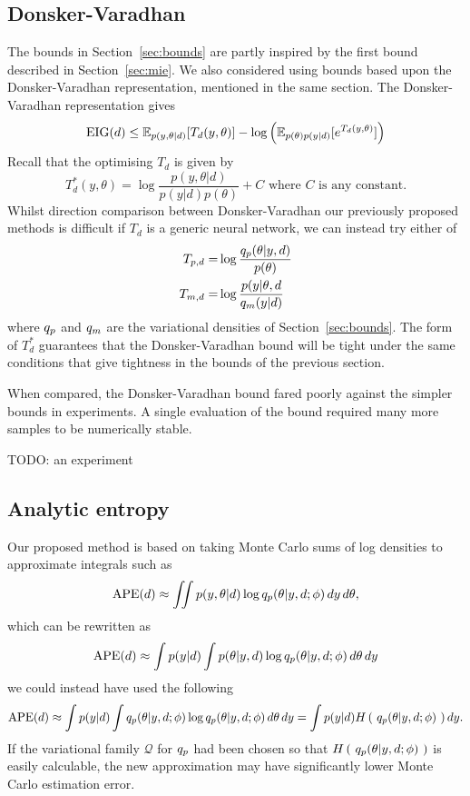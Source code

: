 \subsection{Donsker-Varadhan}
The bounds in Section~\ref{sec:bounds} are partly inspired by the first bound described in Section~\ref{sec:mie}. We also considered using bounds based upon the Donsker-Varadhan representation, mentioned in the same section. The Donsker-Varadhan representation gives
\begin{equation}
	\label{eq:dveig}
	\text{EIG}(d) \le \mathbb{E}_{p(y,\theta|d)} [T_d(y, \theta)] - \log\left(\mathbb{E}_{p(\theta)p(y|d)}[e^{T_d(y,\theta)}] \right)
\end{equation}
Recall that the optimising $T_d$ is given by
\begin{equation}
	T_d^*(y, \theta) = \log\frac{p(y,\theta|d)}{p(y|d)p(\theta)} + C \text{ where }C\text{ is any constant.}
\end{equation}
Whilst direction comparison between Donsker-Varadhan our previously proposed methods is difficult if $T_d$ is a generic neural network, we can instead try either of
\begin{align}
	T_{p, d} =& \log \frac{q_p(\theta | y,d)}{p(\theta)} \\
	T_{m, d} =& \log \frac{p(y|\theta,d}{q_m(y|d)}
\end{align}
where $q_p$ and $q_m$ are the variational densities of Section~\ref{sec:bounds}. The form of $T_d^*$ guarantees that the Donsker-Varadhan bound will be tight under the same conditions that give tightness in the bounds of the previous section.

When compared, the Donsker-Varadhan bound fared poorly against the simpler bounds in experiments. A single evaluation of the bound required many more samples to be numerically stable.

TODO: an experiment

\subsection{Analytic entropy}
Our proposed method is based on taking Monte Carlo sums of log densities to approximate integrals such as
\begin{equation}
	\text{APE}(d) \approx \iint p(y, \theta | d) \log q_p (\theta | y, d; \phi)\, dy\, d\theta,
\end{equation}
which can be rewritten as
\begin{equation}
	\text{APE}(d) \approx \int p(y|d) \int p(\theta | y, d) \log q_p (\theta | y, d; \phi)\, d\theta\, dy
\end{equation}
we could instead have used the following
\begin{equation}
	\text{APE}(d) \approx \int p(y|d) \int q_p (\theta | y, d; \phi) \log q_p (\theta | y, d; \phi)\, d\theta\, dy = \int p(y|d) H\left(\ q_p (\theta | y, d; \phi)\ \right) dy.
\end{equation}
If the variational family $\mathcal{Q}$ for $q_p$ had been chosen so that $H\left(\ q_p (\theta | y, d; \phi)\ \right)$ is easily calculable, the new approximation may have significantly lower Monte Carlo estimation error.

